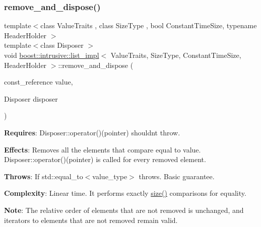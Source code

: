 \subsubsection{\texorpdfstring{remove\+\_\+and\+\_\+dispose()}{remove\_and\_dispose()}}
{\footnotesize\ttfamily template$<$class Value\+Traits , class Size\+Type , bool Constant\+Time\+Size, typename Header\+Holder $>$ \\
template$<$class Disposer $>$ \\
void \hyperlink{classboost_1_1intrusive_1_1list__impl}{boost\+::intrusive\+::list\+\_\+impl}$<$ Value\+Traits, Size\+Type, Constant\+Time\+Size, Header\+Holder $>$\+::remove\+\_\+and\+\_\+dispose (\begin{DoxyParamCaption}\item[{const\+\_\+reference}]{value,  }\item[{Disposer}]{disposer }\end{DoxyParamCaption})\hspace{0.3cm}{\ttfamily [inline]}}

{\bfseries Requires}\+: Disposer\+::operator()(pointer) shouldn\textquotesingle{}t throw.

{\bfseries Effects}\+: Removes all the elements that compare equal to value. Disposer\+::operator()(pointer) is called for every removed element.

{\bfseries Throws}\+: If std\+::equal\+\_\+to$<$value\+\_\+type$>$ throws. Basic guarantee.

{\bfseries Complexity}\+: Linear time. It performs exactly \hyperlink{classboost_1_1intrusive_1_1list__impl_a9da0074a31566f3a7dbc3cd1a2d752c1}{size()} comparisons for equality.

{\bfseries Note}\+: The relative order of elements that are not removed is unchanged, and iterators to elements that are not removed remain valid. \mbox{\label{classboost_1_1intrusive_1_1list__impl_afb94638a081eb6fed0bf005b04cf9f88}} 
